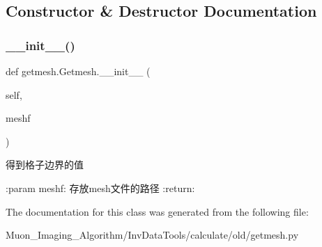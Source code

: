 \subsection{Constructor \& Destructor Documentation}
\mbox{\label{classgetmesh_1_1Getmesh_ad96df31062e387cf0c847c7f35e7eee0}} 
\subsubsection{\texorpdfstring{\+\_\+\+\_\+init\+\_\+\+\_\+()}{\_\_init\_\_()}}
{\footnotesize\ttfamily def getmesh.\+Getmesh.\+\_\+\+\_\+init\+\_\+\+\_\+ (\begin{DoxyParamCaption}\item[{}]{self,  }\item[{}]{meshf }\end{DoxyParamCaption})}

\begin{DoxyVerb}得到格子边界的值

:param meshf: 存放mesh文件的路径
:return:
\end{DoxyVerb}
 

The documentation for this class was generated from the following file\+:\begin{DoxyCompactItemize}
\item 
Muon\+\_\+\+Imaging\+\_\+\+Algorithm/\+Inv\+Data\+Tools/calculate/old/getmesh.\+py\end{DoxyCompactItemize}
